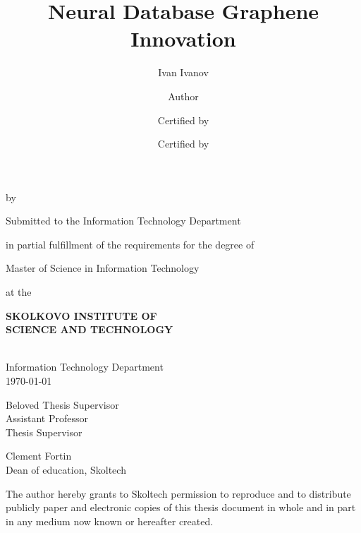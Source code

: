 \title{Neural Database Graphene Innovation}

\author{Ivan Ivanov}

\makeatletter
\begin{titlepage}
\begin{center}

{\LARGE{\bf\@title}} \par {\large by} \par {\Large\@author} \par
{\large Submitted to the Information Technology Department \par in partial fulfillment of the requirements for the degree of \par Master of Science in Information Technology \par at the \par {\Large\bf SKOLKOVO INSTITUTE OF \\ SCIENCE AND TECHNOLOGY}}

\vspace{8em}
\signature{Author}{\@author \\ Information Technology Department \\ \today}

\par\vfill
\signature{Certified by}{Beloved Thesis Supervisor \\ Assistant Professor \\Thesis Supervisor}

\par\vfill
\signature{Certified by}{Clement Fortin \\ Dean of education, Skoltech}

\par\vfill

The author hereby grants to Skoltech permission to reproduce and to distribute publicly paper and electronic copies of this thesis document in whole and in part in any medium now known or hereafter created.

\end{center}
\end{titlepage}
\makeatother